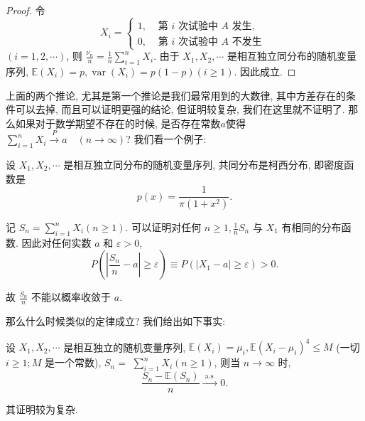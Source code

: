 \begin{proof}令
$$
X_i= \begin{cases}1, & \text { 第 } i \text { 次试验中 } A \text { 发生, } \\ 0, & \text { 第 } i \text { 次试验中 } A \text { 不发生 }\end{cases}
$$
$(i=1,2, \cdots)$, 则 $\frac{\nu_n}{n}=\frac{1}{n} \sum_{i=1}^n X_i$. 由于 $X_1, X_2, \cdots$ 是相互独立同分布的随机变量序列, $\mathbb{E}\left(X_i\right)=p, \operatorname{var}\left(X_i\right)=p(1-p)(i \geq 1)$. 因此成立.
\end{proof}

上面的两个推论, 尤其是第一个推论是我们最常用到的大数律, 其中方差存在的条件可以去掉, 而且可以证明更强的结论, 但证明较复杂, 我们在这里就不证明了. 那么如果对于数学期望不存在的时候, 是否存在常数$a$使得$\sum_{i=1}^n X_i \stackrel{P}{\longrightarrow} a \quad(n \rightarrow \infty)$? 我们看一个例子: 

\begin{example}
    设 $X_1, X_2, \cdots$ 是相互独立同分布的随机变量序列, 共同分布是柯西分布, 即密度函数是
$$
p(x)=\frac{1}{\pi\left(1+x^2\right)} .
$$

记 $S_n=\sum_{i=1}^n X_i(n \geq 1)$. 可以证明对任何 $n \geq 1, \frac{1}{n} S_n$ 与 $X_1$ 有相同的分布函数. 因此对任何实数 $a$ 和 $\varepsilon>0$,
$$
P\left(\left|\frac{S_n}{n}-a\right| \geq \varepsilon\right) \equiv P\left(\left|X_1-a\right| \geq \varepsilon\right)>0 .
$$

故 $\frac{S_n}{n}$ 不能以概率收敛于 $a$.
\end{example}

那么什么时候类似的定律成立? 我们给出如下事实: 

\begin{theorem}
      设 $X_1, X_2, \cdots$ 是相互独立的随机变量序列, $\mathbb{E}\left(X_i\right)=\mu_i, \mathbb{E}\left(X_i-\mu_i\right)^4 \leq M$ (一切 $i \geq 1 ; M$ 是一个常数), $S_n=$ $\sum_{i=1}^n X_i(n \geq 1)$, 则当 $n \rightarrow \infty$ 时,
$$
\frac{S_n-\mathbb{E}\left(S_n\right)}{n} \stackrel{\text { a.s. }}{\longrightarrow} 0 .
$$
\end{theorem}

其证明较为复杂. 

